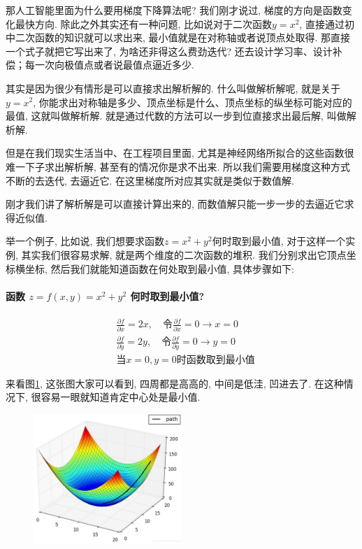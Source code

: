 那人工智能里面为什么要用梯度下降算法呢?  我们刚才说过, 梯度的方向是函数变化最快方向. 除此之外其实还有一种问题, 比如说对于二次函数$y=x^2$, 直接通过初中二次函数的知识就可以求出来, 最小值就是在对称轴或者说顶点处取得. 那直接一个式子就把它写出来了, 为啥还非得这么费劲迭代? 还去设计学习率、设计补偿；每一次向极值点或者说最值点逼近多少. 

其实是因为很少有情形是可以直接求出解析解的. 什么叫做解析解呢, 就是关于$y = x^2$, 你能求出对称轴是多少、顶点坐标是什么、顶点坐标的纵坐标可能对应的最值, 这就叫做解析解. 就是通过代数的方法可以一步到位直接求出最后解, 叫做解析解. 

但是在我们现实生活当中、在工程项目里面, 尤其是神经网络所拟合的这些函数很难一下子求出解析解, 甚至有的情况你是求不出来. 所以我们需要用梯度这种方式不断的去迭代, 去逼近它.  在这里梯度所对应其实就是类似于数值解. 

刚才我们讲了解析解是可以直接计算出来的, 而数值解只能一步一步的去逼近它求得近似值. 

举一个例子, 比如说, 我们想要求函数$z=x^2+y^2$何时取到最小值, 对于这样一个实例, 其实我们很容易求解, 就是两个维度的二次函数的堆积. 我们分别求出它顶点坐标横坐标, 然后我们就能知道函数在何处取到最小值, 具体步骤如下:
\paragraph{函数 $z = f(x, y) = x^2 + y^2$ 何时取到最小值?}
\begin{align*}
  & \frac{\partial f}{\partial x} = 2x, \quad \mbox{令}\frac{\partial f}{\partial x} = 0 \to x = 0\\
  & \frac{\partial f}{\partial y} = 2y, \quad \mbox{令}\frac{\partial f}{\partial y} = 0 \to y = 0 \\
  & \mbox{当}x=0, y=0\mbox{时函数取到最小值}
\end{align*}

来看图\ref{fig:img13_3}, 这张图大家可以看到, 四周都是高高的, 中间是低洼, 凹进去了. 在这种情况下, 很容易一眼就知道肯定中心处是最小值. 

\begin{figure}[ht]
  \centering
  \includegraphics[width=0.5\textwidth]{asset/20230902170354.png}
  \caption{}
  \label{fig:img13_3}
\end{figure}

